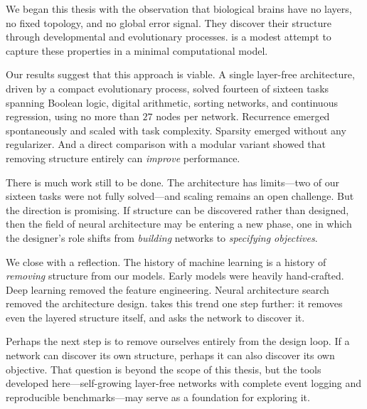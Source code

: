 We began this thesis with the observation that biological brains have
no layers, no fixed topology, and no global error signal. They
discover their structure through developmental and evolutionary
processes. \modnet{} is a modest attempt to capture these properties
in a minimal computational model.

Our results suggest that this approach is viable. A single
layer-free architecture, driven by a compact evolutionary process,
solved fourteen of sixteen tasks spanning Boolean logic, digital
arithmetic, sorting networks, and continuous regression, using no more
than $27$ nodes per network. Recurrence emerged spontaneously and
scaled with task complexity. Sparsity emerged without any regularizer.
And a direct comparison with a modular variant showed that removing
structure entirely can \emph{improve} performance.

There is much work still to be done. The architecture has limits---two
of our sixteen tasks were not fully solved---and scaling remains an
open challenge. But the direction is promising. If structure can be
discovered rather than designed, then the field of neural architecture
may be entering a new phase, one in which the designer's role shifts
from \emph{building} networks to \emph{specifying objectives}.

We close with a reflection. The history of machine learning is a
history of \emph{removing} structure from our models. Early models were
heavily hand-crafted. Deep learning removed the feature engineering.
Neural architecture search removed the architecture design. \modnet{}
takes this trend one step further: it removes even the layered
structure itself, and asks the network to discover it.

Perhaps the next step is to remove ourselves entirely from the design
loop. If a network can discover its own structure, perhaps it can
also discover its own objective. That question is beyond the scope of
this thesis, but the tools developed here---self-growing layer-free
networks with complete event logging and reproducible benchmarks---may
serve as a foundation for exploring it.

